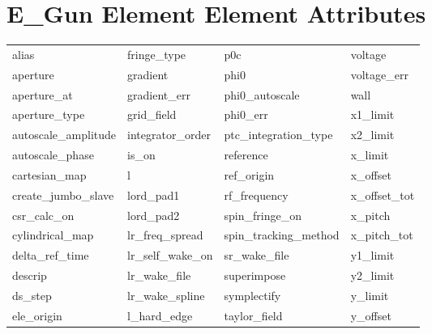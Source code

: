  \section{E_Gun Element Element Attributes}
 \label{s:list.e.gun}
 
 \begin{tabular}{llll} \toprule
alias                       & fringe_type                 & p0c                         & voltage                     \\
aperture                    & gradient                    & phi0                        & voltage_err                 \\
aperture_at                 & gradient_err                & phi0_autoscale              & wall                        \\
aperture_type               & grid_field                  & phi0_err                    & x1_limit                    \\
autoscale_amplitude         & integrator_order            & ptc_integration_type        & x2_limit                    \\
autoscale_phase             & is_on                       & reference                   & x_limit                     \\
cartesian_map               & l                           & ref_origin                  & x_offset                    \\
create_jumbo_slave          & lord_pad1                   & rf_frequency                & x_offset_tot                \\
csr_calc_on                 & lord_pad2                   & spin_fringe_on              & x_pitch                     \\
cylindrical_map             & lr_freq_spread              & spin_tracking_method        & x_pitch_tot                 \\
delta_ref_time              & lr_self_wake_on             & sr_wake_file                & y1_limit                    \\
descrip                     & lr_wake_file                & superimpose                 & y2_limit                    \\
ds_step                     & lr_wake_spline              & symplectify                 & y_limit                     \\
ele_origin                  & l_hard_edge                 & taylor_field                & y_offset                    \\

\end{tabular}
